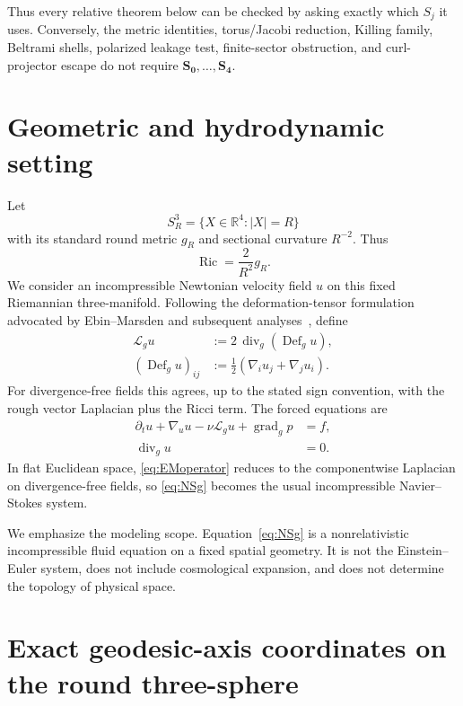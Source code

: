 \documentclass[aps,prd,reprint,superscriptaddress,nofootinbib,floatfix]{revtex4-2}
\theoremstyle{definition}
\theoremstyle{remark}
\newcommand{\Sthree}{S^3_R}
\newcommand{\RR}{\mathbb{R}}
\newcommand{\Def}{\operatorname{Def}}
\newcommand{\divg}{\operatorname{div}_g}
\newcommand{\gradg}{\operatorname{grad}_g}
\newcommand{\Ric}{\operatorname{Ric}}
\newcommand{\cL}{\mathcal{L}}
\begin{document}
Thus every relative theorem below can be checked by asking exactly which \(S_j\) it uses.  Conversely, the metric identities, torus/Jacobi reduction, Killing family, Beltrami shells, polarized leakage test, finite-sector obstruction, and curl-projector escape do not require \(\mathbf{S_0},\dots,\mathbf{S_4}\).

\section{Geometric and hydrodynamic setting}\label{sec:setting}

Let
\begin{equation}
	\Sthree=\{X\in\RR^4:|X|=R\}
\end{equation}
with its standard round metric $g_R$ and sectional curvature $R^{-2}$. Thus
\begin{equation}
	\Ric=\frac{2}{R^2}g_R.
\end{equation}
We consider an incompressible Newtonian velocity field $u$ on this fixed Riemannian three-manifold. Following the deformation-tensor formulation advocated by Ebin--Marsden and subsequent analyses~\cite{EbinMarsden1970,ChanCzubakDisconzi2017,SamavakiTuomela2020}, define
\begin{align}
	\cL_g u         & :=2\,\operatorname{div}_g(\Def_g u),\nonumber \\
	(\Def_g u)_{ij} & :=\frac12(\nabla_i u_j+\nabla_j u_i).
	\label{eq:EMoperator}
\end{align}
For divergence-free fields this agrees, up to the stated sign convention, with the rough vector Laplacian plus the Ricci term. The forced equations are
\begin{align}
	\partial_t u+\nabla_u u-\nu\cL_g u+\gradg p & =f,\label{eq:NSg}  \\
	\divg u                                     & =0.\label{eq:divg}
\end{align}
In flat Euclidean space, \cref{eq:EMoperator} reduces to the componentwise Laplacian on divergence-free fields, so \cref{eq:NSg} becomes the usual incompressible Navier--Stokes system.

We emphasize the modeling scope. Equation~\eqref{eq:NSg} is a nonrelativistic incompressible fluid equation on a fixed spatial geometry. It is not the Einstein--Euler system, does not include cosmological expansion, and does not determine the topology of physical space.


\section{Exact geodesic-axis coordinates on the round three-sphere}\label{sec:coords}
\end{document}
